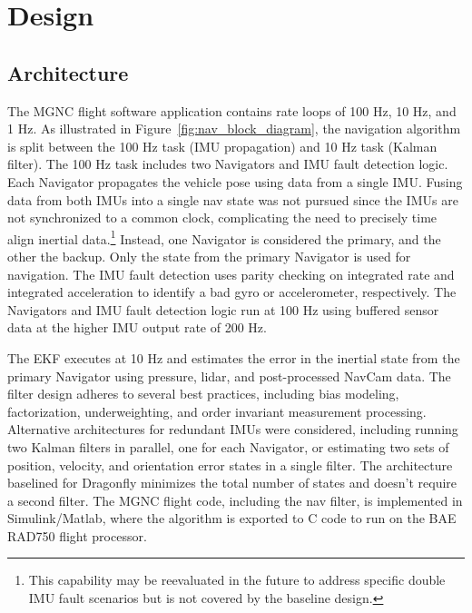 \section{Design} 

\label{design}

\subsection{Architecture}

The \ac{MGNC} flight software application contains rate loops of 100 Hz, 10 Hz, and 1 Hz. As illustrated in Figure~\ref{fig:nav_block_diagram}, the navigation algorithm is split between the 100 Hz task (\ac{IMU} propagation) and 10 Hz task (Kalman filter). The 100 Hz task includes two Navigators and \ac{IMU} fault detection logic. Each Navigator propagates the vehicle pose \cite{savageAttitude, savagePosition} using data from a single \ac{IMU}. Fusing data from both \acp{IMU} into a single nav state was not pursued since the \acp{IMU} are not synchronized to a common clock, complicating the need to precisely time align inertial data.\footnote{This capability may be reevaluated in the future to address specific double IMU fault scenarios but is not covered by the baseline design.} Instead, one Navigator is considered the primary, and the other the backup. Only the state from the primary Navigator is used for navigation. The \ac{IMU} fault detection uses parity checking on integrated rate and integrated acceleration to identify a bad gyro or accelerometer, respectively. The Navigators and \ac{IMU} fault detection logic run at 100 Hz using buffered sensor data at the higher \ac{IMU} output rate of 200 Hz.  

The \ac{EKF} executes at 10 Hz and estimates the error in the inertial state from the primary Navigator using pressure, lidar, and post-processed \ac{NavCam} data. The filter design adheres to several best practices, including bias modeling, factorization, underweighting, and order invariant measurement processing.\cite{carpenter2018} Alternative architectures for redundant IMUs were considered, including running two Kalman filters in parallel, one for each Navigator, or estimating two sets of position, velocity, and orientation error states in a single filter. The architecture baselined for Dragonfly minimizes the total number of states and doesn't require a second filter. The \ac{MGNC} flight code, including the nav filter, is implemented in Simulink/Matlab, where the algorithm is exported to C code to run on the BAE RAD750 flight processor.     

